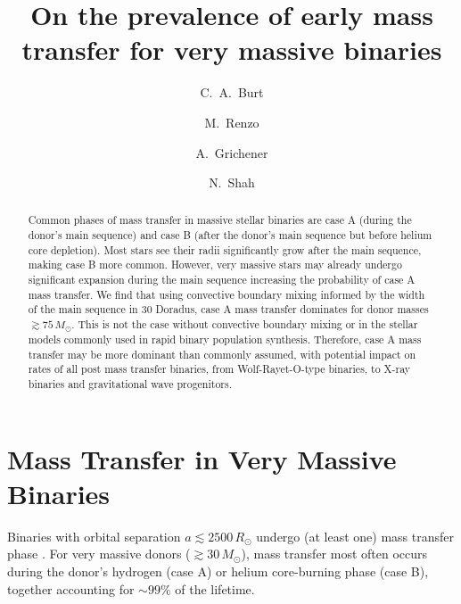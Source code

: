 \documentclass[twocolumn]{aastex631}
\begin{document}
\title{On the prevalence of early mass transfer for very massive binaries}

\author[0009-0008-2061-4946]{C.~A.~Burt}

\author[0000-0002-6718-9472]{M.~Renzo}

\author[0000-0002-2215-1841]{A.~Grichener}

\author[0000-0002-8465-8090]{N.~Shah}




\begin{abstract}
  Common phases of mass transfer in massive stellar binaries are case
  A (during the donor's main sequence) and case B (after the donor's
  main sequence but before helium core depletion). Most stars see
  their radii significantly grow after the main sequence, making case
  B more common. However, very massive stars may already undergo
  significant expansion during the main sequence increasing the
  probability of case A mass transfer. We find that using convective
  boundary mixing informed by the width of the main sequence in 30
  Doradus, case A mass transfer dominates for donor masses
  $\gtrsim 75 \, M_{\odot}$. This is not the case without convective
  boundary mixing or in the stellar models commonly used in rapid
  binary population synthesis. Therefore, case A mass transfer may be
  more dominant than commonly assumed, with potential impact on rates
  of all post mass transfer binaries, from Wolf-Rayet-O-type binaries,
  to X-ray binaries and gravitational wave progenitors.
\end{abstract}

\section{Mass Transfer in Very Massive Binaries}

Binaries with orbital separation $a\lesssim2500\,R_{\odot}$ undergo
(at least one) mass transfer phase \citep{sana:12}. For very massive
donors ($ \gtrsim 30 \, M_{\odot}$), mass transfer most often occurs
during the donor's hydrogen (case A) or helium core-burning phase
(case B), together accounting for $\sim99\%$ of the lifetime.
\end{document}
